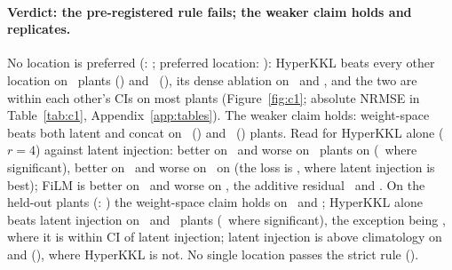 \paragraph{Verdict: the pre-registered rule fails; the weaker claim holds and replicates.} No location is preferred (: \OutcomeCOneWhere; preferred location: \ConePreferredLocation): HyperKKL beats every other location on \ConeLoraBeatsAllShape\ plants () and \ConeLoraBeatsAllSeq\ (), its dense ablation on \ConeHyperBeatsAllShape\ and \ConeHyperBeatsAllSeq, and the two are within each other's CIs on most plants (Figure~\ref{fig:c1}; absolute NRMSE in Table~\ref{tab:c1}, Appendix~\ref{app:tables}). The weaker claim holds: weight-space beats both latent and concat on \ConeWeightSpaceBeatsLatConcShape\ () and \ConeWeightSpaceBeatsLatConcSeq\ () plants. Read for HyperKKL alone ($r=4$) against latent injection: better on \ConeLoraBeatsLatentShape\ and worse on \ConeLoraLosesLatentShape\ plants on  (\ConeLoraVsLatentRangeShape\ where significant), better on \ConeLoraBeatsLatentSeq\ and worse on \ConeLoraLosesLatentSeq\ on  (the loss is , where latent injection is best); FiLM is better on \ConeFilmBeatsLatentShape\ and worse on \ConeFilmLosesLatentShape, the additive residual \ConeConcatBeatsLatentShape\ and \ConeConcatLosesLatentShape. On the held-out plants (: \OutcomeTESTCOne) the weight-space claim holds on \CtestWeightSpaceBeatsLatConcShape\ and \CtestWeightSpaceBeatsLatConcSeq; HyperKKL alone beats latent injection on \CtestLoraBeatsLatentShape\ and \CtestLoraBeatsLatentSeq\ plants (\CtestLoraVsLatentRangeShape\ where significant), the exception being , where it is within CI of latent injection; latent injection is above climatology on  and  (), where HyperKKL is not. No single location passes the strict rule (\CtestPreferredLocation).

